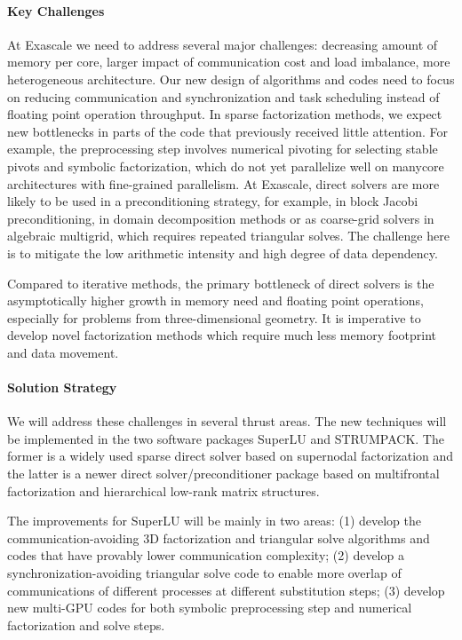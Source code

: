 \paragraph{Key Challenges}
At Exascale we need to address several major challenges:
decreasing amount of memory per core, larger impact of communication
cost and load imbalance, more heterogeneous architecture.
Our new design of algorithms and codes need to focus on
reducing communication and synchronization and task scheduling 
instead of floating point operation throughput. In sparse factorization
methods, we expect new bottlenecks in parts of the code
that previously received little attention. For example, the preprocessing
step involves numerical pivoting for selecting stable pivots and
symbolic factorization, which do not yet parallelize well on manycore
architectures with fine-grained parallelism.
At Exascale, direct solvers are more likely to
be used in a preconditioning strategy, for example, in block Jacobi
preconditioning, in domain decomposition methods or as coarse-grid
solvers in algebraic multigrid, which requires repeated triangular
solves. The challenge here is to mitigate the low arithmetic intensity
and high degree of data dependency.

Compared to iterative methods, the primary bottleneck of direct solvers
is the asymptotically higher growth in memory need and floating point
operations, especially for problems from three-dimensional geometry.
It is imperative to develop novel factorization methods which require
much less memory footprint and data movement.


\paragraph{Solution Strategy}
We will address these challenges in several thrust areas.
The new techniques will be implemented in the two software packages SuperLU
and STRUMPACK. The former is a widely used sparse direct solver based on
supernodal factorization and the latter is a newer direct
solver/preconditioner package based on multifrontal factorization 
and hierarchical low-rank matrix structures.

The improvements for SuperLU will be mainly in two areas: (1) develop
the communication-avoiding 3D factorization and triangular solve
algorithms and codes that have provably lower communication complexity;
(2) develop a synchronization-avoiding triangular solve code to enable more
overlap of communications of different processes at different substitution steps;
(3) develop new multi-GPU codes for both symbolic preprocessing step and
numerical factorization and solve steps.

